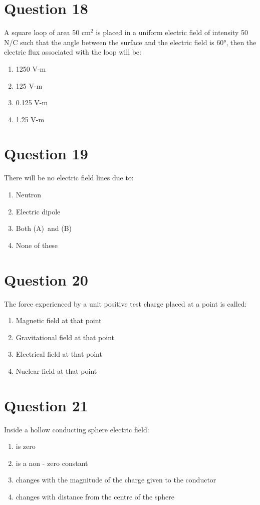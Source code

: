 \documentclass{article}
\begin{document}
\section*{Question 18}
A square loop of area 50 cm$^{2}$ is placed in a uniform electric field of intensity 50 N/C such that the angle between the surface and the electric field is 60°, then the electric flux associated with the loop will be:
\begin{enumerate}[label=(\alph*)]
\item 1250 V-m
\item 125 V-m
\item 0.125 V-m
\item 1.25 V-m
\end{enumerate}
\newpage
\section*{Question 19}
There will be no electric field lines due to:
\begin{enumerate}[label=(\alph*)]
\item Neutron
\item Electric dipole
\item Both (A) and (B)
\item None of these
\end{enumerate}
\newpage
\section*{Question 20}
The force experienced by a unit positive test charge placed at a point is called:
\begin{enumerate}[label=(\alph*)]
\item Magnetic field at that point
\item Gravitational field at that point
\item Electrical field at that point
\item Nuclear field at that point
\end{enumerate}
\newpage
\section*{Question 21}
Inside a hollow conducting sphere electric field:
\begin{enumerate}[label=(\alph*)]
\item is zero
\item is a non - zero constant
\item changes with the magnitude of the charge given to the conductor
\item changes with distance from the centre of the sphere
\end{enumerate}
\newpage
\end{document}
